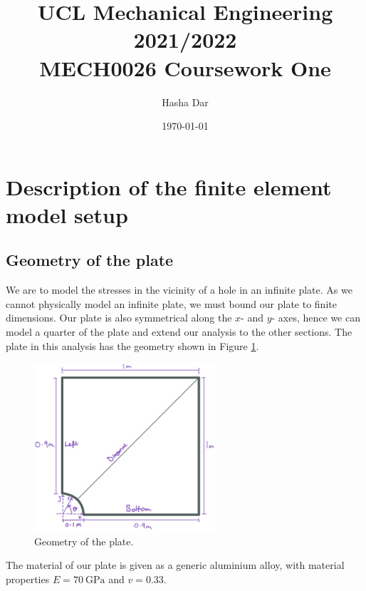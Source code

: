 \documentclass[11pt]{article}
\numberwithin{equation}{section}
\begin{document}
\title{\textbf{UCL Mechanical Engineering 2021/2022}\\MECH0026 Coursework One}
\author{Hasha Dar}
\date{\today}
\maketitle
\tableofcontents
\listoffigures
\section{Description of the finite element model setup}
\subsection{Geometry of the plate}
We are to model the stresses in the vicinity of a hole in an infinite plate. As we cannot physically model an infinite plate, we must bound our plate to finite dimensions. Our plate is also symmetrical along the $x$- and $y$- axes, hence we can model a quarter of the plate and extend our analysis to the other sections. The plate in this analysis has the geometry shown in Figure \ref{plateGeo}.
\begin{figure}[H]
    \centering
    \includegraphics[width = 0.6\textwidth]{./img/diagram5.jpg}
    \caption{Geometry of the plate.}
    \label{plateGeo}
\end{figure}
The material of our plate is given as a generic aluminium alloy, with material properties $E = \SI{70}{\giga\pascal}$ and $v = 0.33$. 
\end{document}
